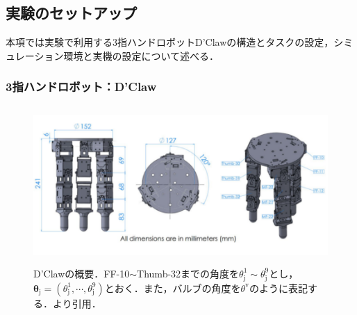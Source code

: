 \documentclass[dvipdfmx]{ampbt_nomag}
\begin{document}
\subsection{実験のセットアップ}
本項では実験で利用する3指ハンドロボットD'Clawの構造とタスクの設定，シミュレーション環境と実機の設定について述べる．

\subsubsection{3指ハンドロボット：D'Claw}
\begin{figure}[hbtp]
  \centering
  \includegraphics[height=6cm]
       {asset/img/dclaw.pdf}
  \caption{D'Clawの概要．FF-10$\sim$Thumb-32までの角度を$\theta^1_{\textrm{j}}\sim\theta^9_{\textrm{j}}$とし，$\boldsymbol{\theta}_{\textrm{j}}=(\theta^1_{\textrm{j}},\cdots,\theta^9_{\textrm{j}})$とおく．また，バルブの角度を$\theta^{\textrm{v}}$のように表記する．\cite{ahn2020robel}より引用．}
  \label{dclaw_structure}
\end{figure}
 
\end{document}
